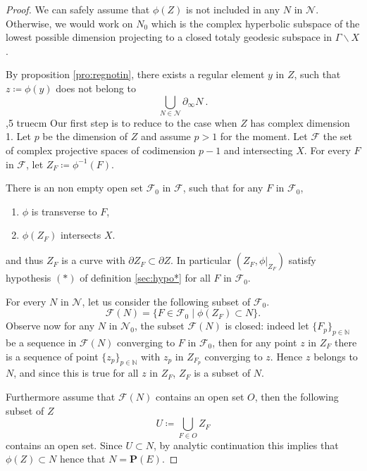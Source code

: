 \documentclass[10pt,a4paper]{amsart}
\newcommand{\bP}{{\mathbf P}}
\newcommand{\defeq}{\coloneqq}
\newcommand{\mc}{\mathcal}
\newcommand{\seq}[1]{ \{{#1}_p\}_{p\in\mathbb N}}
\begin{document}
\begin{proof} 
We can safely assume that $\phi(Z)$ is not included in any $N$ in $\mc N$. Otherwise, we would work on $N_0$ which is the complex hyperbolic subspace of the lowest possible dimension projecting to a closed totaly geodesic subspace in $\Gamma\backslash X$.

By proposition \ref{pro:regnotin}, there exists a regular element $y$ in $Z$, such that $z\defeq\phi(y)$ does not belong to 
 $$
 \bigcup_{N\in\mc N}\partial_\infty N\ .$$  
 ,5 truecm
Our first step is to reduce to the case  when $Z$ has complex dimension 1. 
 Let $p$ be the dimension of $Z$ and assume $p>1$ for the moment. 
 Let  $\mc F$ the set of complex projective spaces of codimension $p-1$ and intersecting $X$. 
For every $F$ in $\mc F$, let $Z_F\defeq \phi^{-1}(F)$.

There is an non empty open set $\mc F_0$ in $\mc F$, such that for any $F$ in $\mc F_0$, 
\begin{enumerate}
	\item $\phi$ is transverse to $F$,
	\item $\phi(Z_F)$ intersects $X$.
\end{enumerate}
and thus $Z_F$ is a curve with $\partial Z_F\subset \partial Z$. In particular $(Z_F,\phi\vert_{Z_F})$ satisfy hypothesis $(*)$ of definition \ref{sec:hypo*} for all $F$ in $\mc F_0$.   

For every $N$ in $\mc N$, let us consider the following subset of $\mc F_0$.
$$
{\mc F}(N)=\{F\in \mc F_0\mid \phi(Z_F)\subset N\}.
$$ 
Observe now for any $N$ in $\mc N_0$, the subset  ${\mc F}(N)$ is closed: indeed let $\seq{F}$ be a sequence in  ${\mc F}(N)$ converging to $F$ in $\mc F_0$, then for any point $z$ in $Z_F$ there is a sequence of point $\seq{z}$ with $z_p$ in $Z_{F_p}$ converging to $z$. Hence $z$ belongs to $N$, and since this is true for all $z$ in $Z_F$, $Z_F$ is a subset of $N$.

Furthermore assume that   
${\mc F}(N)$ contains an open set $O$, then the following subset of $Z$
$$
U\defeq \bigcup_{F\in O}Z_F 
$$
contains an open set. Since $U\subset N$, by analytic continuation this implies that $\phi(Z)\subset N$ hence that $N=\bP(E)$. 


\end{proof}
\end{document}

